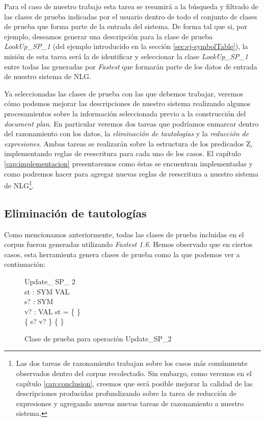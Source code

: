 Para el caso de nuestro trabajo esta tarea se resumirá a la búsqueda y filtrado de las clases de prueba indicadas por el usuario dentro de todo el conjunto de clases de prueba que forma parte de la entrada del sistema. De forma tal que si, por ejemplo, deseamos generar una descripción para la clase de prueba \emph{LookUp\_SP\_1} (del ejemplo introducido en la sección \ref{sec:ej-symbolTable}), la misión de esta tarea será la de identificar y seleccionar la clase \emph{LookUp\_SP\_1} entre todas las generadas por \emph{Fastest} que formarán parte de los datos de entrada de nuestro sistema de NLG.


Ya seleccionadas las clases de prueba con las que debemos trabajar, veremos cómo podemos mejorar las descripciones de nuestro sistema realizando algunos procesamientos sobre la información seleccionada previo a la construcción del \textit{document plan}. En particular veremos dos tareas que podríamos enmarcar dentro del razonamiento con los datos, la \emph{eliminación de tautologías} y la \emph{reducción de expresiones}. Ambas tareas se realizarán sobre la estructura de los predicados Z, implementando reglas de reescritura para cada uno de los casos. El capítulo \ref{cap:implementacion} presentaremos como éstas se encuentran implementadas y como podremos hacer para agregar nuevas reglas de reescritura a nuestro sistema de NLG\footnote{Las dos tareas de razonamiento trabajan sobre los casos más comúnmente observados dentro del corpus recolectado. Sin embargo, como veremos en el capítulo \ref{cap:conclusion}, creemos que será posible mejorar la calidad de las descripciones producidas profundizando sobre la tarea de reducción de expresiones y agregando nuevas nuevas tareas de razonamiento a nuestro sistema.}.

\subsection*{Eliminación de tautologías}
Como mencionamos anteriormente, todas las clases de prueba incluidas en el corpus fueron generadas utilizando \emph{Fastest 1.6}. Hemos observado que en ciertos casos, esta herramienta genera clases de prueba como la que podemos ver a continuación:

\begin{figure}[H]
  \centering
\begin{schema}{Update\_ SP\_ 2}\\
 st : SYM \pfun VAL \\
 s? : SYM \\
 v? : VAL 
\where
 st = \{ \} \\
 \{ s? \mapsto v? \} \neq \{ \}
\end{schema}
  \caption{Clase de prueba para operación Update\_SP\_2}
  \label{fig:ej_update_sp_2}
\end{figure}

